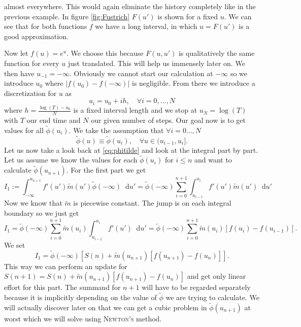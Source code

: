 \documentclass[12pt,a4paper,twoside, open=right]{scrreprt}
\theoremstyle{definition}
\theoremstyle{plain}
\newcommand{\abs}[1]{\left\vert #1\right\vert}
\newcommand{\D}{\mathop{}\!\mathrm{d}}
\begin{document}
almost everywhere. This would again eliminate the history completely like in the previous example. In figure \ref{fig:Fustrich} $F(u')$ is shown for a fixed $u$. We can see that for both functions $f$ we have a long interval, in which $u=F(u')$ is a good approximation. \par 
Now let $f(u)=e^u$. We choose this because $F(u,u')$ is qualitatively the same function for every $u$ just translated. This will help us immensely later on. We then have $u_{-1}=-\infty$. Obviously we cannot start our calculation at $-\infty$ so we introduce $u_0$ where $\abs{f(u_0)-f(-\infty)}$ is negligible. From there we introduce a discretization for $u$ as
\begin{equation}
    u_i = u_0+ih,\quad\forall i=0,\dotsc,N
\end{equation}
where $h = \frac{\log(T) -u_0}{N}$ is a fixed interval length and we stop at $u_N=\log(T)$ with $T$ our end time and $N$ our given number of steps. Our goal now is to get values for all $\tilde\phi(u_i)$. We take the assumption that $\forall i=0\dotsc,N$
\begin{equation}
    \tilde\phi(u) \equiv \tilde\phi(u_i), \quad\forall u\in(u_{i-1},u_i].
\end{equation}
Let us now take a look back at \eqref{eq:phitilde} and look at the integral part by part. Let us assume we know the values for each $\tilde\phi(u_i)$ for $i\le n$ and want to calculate $\tilde\phi(u_{n+1})$. For the first part we get
\begin{equation}
    I_1:=\int_{-\infty}^{u_{n+1}}f'(u')\tilde{m}(u')\tilde\phi(-\infty)\D u'=\tilde\phi(-\infty)\sum_{i=0}^{n+1}\int_{u_{i-1}}^{u_i}f'(u')\tilde{m}(u')\D u'
\end{equation}
Now we know that $\tilde{m}$ is piecewise constant. The jump is on each integral boundary so we just get
\begin{equation}
    I_1 = \tilde{\phi}(-\infty)\sum_{i=0}^{n+1}\tilde{m}(u_i)\int_{u_{i-1}}^{u_i}f'(u')\D u' = \tilde{\phi}(-\infty)\sum_{i=0}^{n+1}\tilde{m}(u_i)[f(u_i)-f(u_{i-1})].
\end{equation}
We set 
\begin{equation}
    I_1 = \tilde\phi(-\infty)[S(n)+\tilde{m}(u_{n+1})[f(u_{n+1})-f(u_n)]].
\end{equation}
This way we can perform an update for $S(n+1) = S(n)+\tilde{m}(u_{n+1})[f(u_{n+1})-f(u_n)]$ and get only linear effort for this part. The summand for $n+1$ will have to be regarded separately because it is implicitly depending on the value of $\tilde\phi$ we are trying to calculate. We will actually discover later on that we can get a cubic problem in $\tilde\phi(u_{n+1})$ at worst which we will solve using \textsc{Newton's} method.
\end{document}
